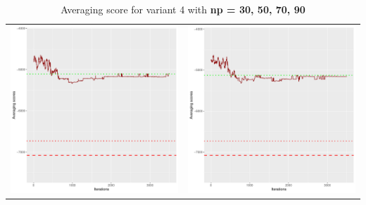 \documentclass[]{scrartcl}
\begin{document}
\begin{table}[h!]
\begin{tabular}{cc}
\includegraphics[scale = 0.4]{./figs/alarm/v4/70/avgBoundsEvolution-3502.pdf} & 
\includegraphics[scale = 0.4]{./figs/alarm/v4/90/avgBoundsEvolution-3502.pdf} \\
\end{tabular}
\caption{Averaging score for variant 4 with \textbf{np =  30, 50, 70, 90 }}
\end{table}
\end{document}

